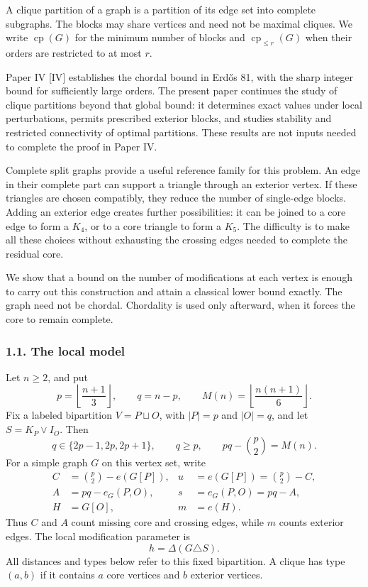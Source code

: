 \documentclass[english,11pt,a4paper]{article}
\begin{document}
A clique partition of a graph is a partition of its edge set into
complete subgraphs. The blocks may share vertices and need not be
maximal cliques. We write \(\operatorname{cp}(G)\) for the minimum
number of blocks and \(\operatorname{cp}_{\le r}(G)\) when their orders
are restricted to at most \(r\).

Paper IV {[}IV{]} establishes the chordal bound in Erdős 81, with the
sharp integer bound for sufficiently large orders. The present paper
continues the study of clique partitions beyond that global bound: it
determines exact values under local perturbations, permits prescribed
exterior blocks, and studies stability and restricted connectivity of
optimal partitions. These results are not inputs needed to complete the
proof in Paper IV.

Complete split graphs provide a useful reference family for this
problem. An edge in their complete part can support a triangle through
an exterior vertex. If these triangles are chosen compatibly, they
reduce the number of single-edge blocks. Adding an exterior edge creates
further possibilities: it can be joined to a core edge to form a
\(K_4\), or to a core triangle to form a \(K_5\). The difficulty is to
make all these choices without exhausting the crossing edges needed to
complete the residual core.

We show that a bound on the number of modifications at each vertex is
enough to carry out this construction and attain a classical lower bound
exactly. The graph need not be chordal. Chordality is used only
afterward, when it forces the core to remain complete.

\subsubsection{1.1. The local model}\label{the-local-model}

Let \(n\ge2\), and put \[
p=\left\lfloor\frac{n+1}{3}\right\rfloor,\qquad
q=n-p,\qquad M(n)=\left\lfloor\frac{n(n+1)}6\right\rfloor.
\] Fix a labeled bipartition \(V=P\sqcup O\), with \(|P|=p\) and
\(|O|=q\), and let \(S=K_P\vee I_O\). Then \[
q\in\{2p-1,2p,2p+1\},\qquad q\ge p,\qquad
pq-\binom p2=M(n). \tag{1}
\] For a simple graph \(G\) on this vertex set, write \[
\begin{aligned}
C&=\binom p2-e(G[P]), &u&=e(G[P])=\binom p2-C,\\
A&=pq-e_G(P,O), &s&=e_G(P,O)=pq-A,\\
H&=G[O], &m&=e(H).
\end{aligned}
\] Thus \(C\) and \(A\) count missing core and crossing edges, while
\(m\) counts exterior edges. The local modification parameter is \[
h=\Delta(G\triangle S). \tag{2}
\] All distances and types below refer to this fixed bipartition. A
clique has type \((a,b)\) if it contains \(a\) core vertices and \(b\)
exterior vertices.
\end{document}
